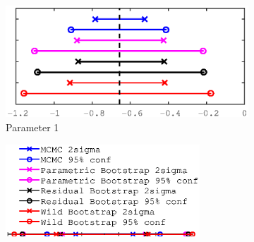 \documentclass[11pt,a4paper,oneside]{report}
\begin{document}
\begin{figure}[H]
   \centering
     \begin{subfigure}[b]{0.5\textwidth}
    \includegraphics[width=\textwidth, trim=0 0 0 0,clip=true]{figures/task5/uncert_model2_param1.eps}
    \caption{Parameter 1}
  \end{subfigure}%
    \begin{subfigure}[b]{0.5\textwidth}
    \includegraphics[width=0.8\textwidth, trim=0 15 0 0,clip=true]{figures/task5/uncert_legend.eps}\\\\\\
  \end{subfigure}%
  

\end{figure}
\end{document}
